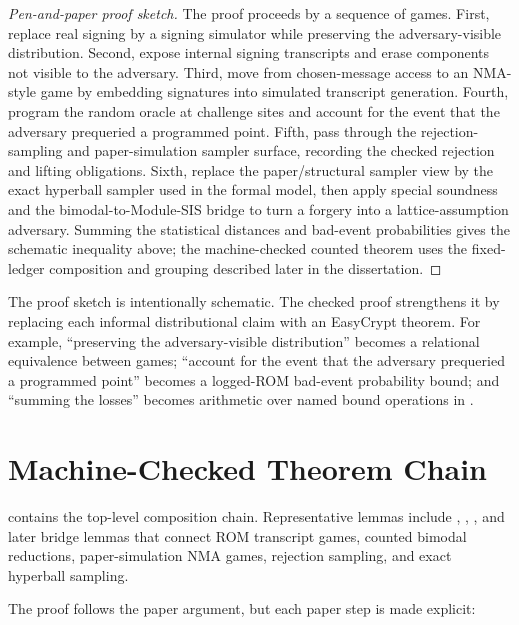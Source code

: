 \begin{proof}[Pen-and-paper proof sketch]
The proof proceeds by a sequence of games.  First, replace real signing by a
signing simulator while preserving the adversary-visible distribution.  Second,
expose internal signing transcripts and erase components not visible to the
adversary.  Third, move from chosen-message access to an NMA-style game by
embedding signatures into simulated transcript generation.  Fourth, program the
random oracle at challenge sites and account for the event that the adversary
prequeried a programmed point.  Fifth, pass through the rejection-sampling and
paper-simulation sampler surface, recording the checked rejection and lifting
obligations.  Sixth, replace the paper/structural sampler view by the exact
hyperball sampler used in the formal model, then apply special soundness and the
bimodal-to-Module-SIS bridge to turn a forgery into a lattice-assumption
adversary.  Summing the statistical distances and bad-event probabilities gives
the schematic inequality above; the machine-checked counted theorem uses the
fixed-ledger composition and grouping described later in the dissertation.
\end{proof}

The proof sketch is intentionally schematic.  The checked proof strengthens it
by replacing each informal distributional claim with an EasyCrypt theorem.  For
example, ``preserving the adversary-visible distribution'' becomes a relational
equivalence between games; ``account for the event that the adversary prequeried
a programmed point'' becomes a logged-ROM bad-event probability bound; and
``summing the losses'' becomes arithmetic over named bound operations in
.

\section{Machine-Checked Theorem Chain}

 contains the top-level composition chain.  Representative
lemmas include , ,
, and later bridge lemmas that
connect ROM transcript games, counted bimodal reductions, paper-simulation NMA
games, rejection sampling, and exact hyperball sampling.

The proof follows the paper argument, but each paper step is made explicit:

